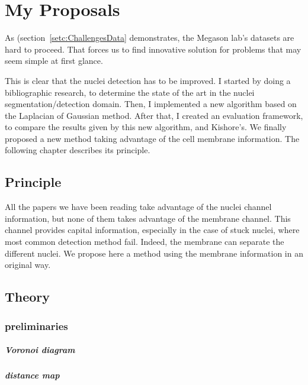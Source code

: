 
\chapter{My Proposals}
\label{chapt:proposal}


As (section~\ref{setc:ChallengesData} demonstrates, the Megason lab's datasets are hard to proceed. That forces us to find innovative solution for problems that may seem simple at first glance.

This is clear that  the nuclei detection has to be improved.
I started by doing a bibliographic research, to determine the state of the art in the nuclei segmentation/detection domain.
Then, I implemented a new algorithm based on the Laplacian of Gaussian method.
After that, I created an evaluation framework, to compare the results given by this new algorithm, and Kishore's.
We finally proposed a new method taking advantage of the cell membrane information. The following chapter describes its principle.

\section{Principle}

All the papers we have been reading take advantage of the nuclei channel information, but none of them takes advantage of the membrane channel.
This channel provides capital information, especially in the case of stuck nuclei, where most common detection method fail.
Indeed, the membrane can separate the different nuclei.
We propose here a method using the membrane information in an original way.

\section{Theory}


\subsection{preliminaries}


\paragraph{Voronoi diagram}


\paragraph{distance map}


